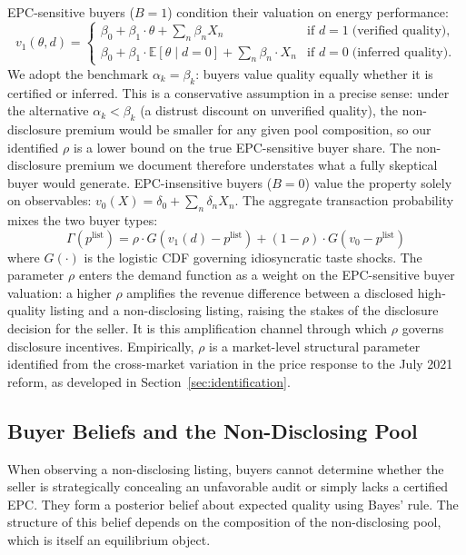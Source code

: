 \documentclass[10pt,letterpaper]{bp-template-concise}
\begin{document}
EPC-sensitive buyers ($B=1$) condition their valuation on energy performance:
\begin{equation}
    v_1(\theta,d) = \begin{cases}
        \beta_0 + \beta_1\cdot\theta + \textstyle\sum_n\beta_n X_n & \text{if } d=1 \;\text{(verified quality)},\\
        \beta_0 + \beta_1\cdot\mathbb{E}[\theta\mid d{=}0] + \textstyle\sum_n\beta_n \cdot X_n & \text{if } d=0 \;\text{(inferred quality)}.
    \end{cases}
\end{equation}
We adopt the benchmark $\alpha_k=\beta_k$: buyers value quality equally whether it is certified or inferred. This is a conservative assumption in a precise sense: under the alternative $\alpha_k<\beta_k$ (a distrust discount on unverified quality), the non-disclosure premium would be smaller for any given pool composition, so our identified $\rho$ is a lower bound on the true EPC-sensitive buyer share. The non-disclosure premium we document therefore understates what a fully skeptical buyer would generate. EPC-insensitive buyers ($B=0$) value the property solely on observables: $v_0(X)=\delta_0+\sum_n\delta_n X_n$. The aggregate transaction probability mixes the two buyer types:
\begin{equation}
    \Gamma(p^{\text{list}}) = \rho\cdot G\!\left(v_1(d)-p^{\text{list}}\right) + (1-\rho)\cdot G\!\left(v_0-p^{\text{list}}\right)
    \label{eq:demand}
\end{equation}
where $G(\cdot)$ is the logistic CDF governing idiosyncratic taste shocks. The parameter $\rho$ enters the demand function as a weight on the EPC-sensitive buyer valuation: a higher $\rho$ amplifies the revenue difference between a disclosed high-quality listing and a non-disclosing listing, raising the stakes of the disclosure decision for the seller. It is this amplification channel through which $\rho$ governs disclosure incentives. Empirically, $\rho$ is a market-level structural parameter identified from the cross-market variation in the price response to the July 2021 reform, as developed in Section~\ref{sec:identification}.

\subsection{Buyer Beliefs and the Non-Disclosing Pool}

When observing a non-disclosing listing, buyers cannot determine whether the seller is strategically concealing an unfavorable audit or simply lacks a certified EPC. They form a posterior belief about expected quality using Bayes' rule. The structure of this belief depends on the composition of the non-disclosing pool, which is itself an equilibrium object.
\end{document}
